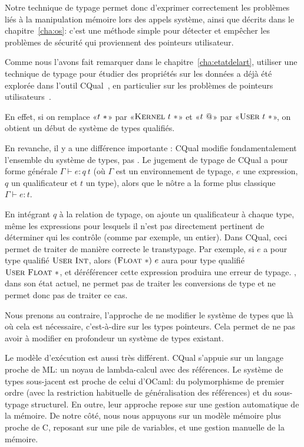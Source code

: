 Notre technique de typage permet donc d'exprimer correctement les problèmes liés
à la manipulation mémoire lors des appels système, ainsi que décrits dans le
chapitre~\ref{cha:os}: c'est une méthode simple pour détecter et empêcher les
problèmes de sécurité qui proviennent des pointeurs utilisateur.

Comme nous l'avons fait remarquer dans le chapitre~\ref{cha:etatdelart},
utiliser une technique de typage pour étudier des propriétés sur les données a
déjà été explorée dans l'outil CQual~\cite{pldi99}, en particulier sur les
problèmes de pointeurs utilisateurs~\cite{cquk-usenix04}.

En effet, si on remplace «$t~*$» par «$\textsc{Kernel}~t~*$» et «$t~@$»
par «$\textsc{User}~t~*$», on obtient un début de système de types qualifiés.

En revanche, il y a une différence importante : CQual modifie fondamentalement
l'ensemble du système de types, pas \langname. Le jugement de typage de CQual a
pour forme générale $Γ ⊢ e : q~t$ (où $Γ$ est un environnement de typage, $e$
une expression, $q$ un qualificateur et $t$ un type), alors que le nôtre a la
forme plus classique $Γ ⊢ e : t$.

En intégrant $q$ à la relation de typage, on ajoute un qualificateur à chaque
type, même les expressions pour lesquels il n'est pas directement pertinent de
déterminer qui les contrôle (comme par exemple, un entier). Dans CQual, ceci
permet de traiter de manière correcte le transtypage. Par exemple, si $e$ a pour
type qualifié $\textsc{User}~\textsc{Int}$, alors $(\textsc{Float}~*)~e$ aura pour type qualifié
$\textsc{User}~\textsc{Float}~*$, et déréférencer cette expression produira une erreur de
typage. \langname, dans son état actuel, ne permet pas de traiter les
conversions de type et ne permet donc pas de traiter ce cas.

Nous prenons au contraire, l'approche de ne modifier le système de types que là
où cela est nécessaire, c'est-à-dire sur les types pointeurs. Cela permet de ne
pas avoir à modifier en profondeur un système de types existant.

Le modèle d'exécution est aussi très différent. CQual s'appuie sur un
langage proche de ML: un noyau de lambda-calcul avec des références. Le système
de types sous-jacent est proche de celui d'OCaml: du polymorphisme de premier
ordre (avec la restriction habituelle de généralisation des références) et du
sous-typage structurel. En outre, leur approche repose sur une gestion
automatique de la mémoire. De notre côté, nous nous appuyons sur un modèle
mémoire plus proche de C, reposant sur une pile de variables, et une gestion
manuelle de la mémoire.

